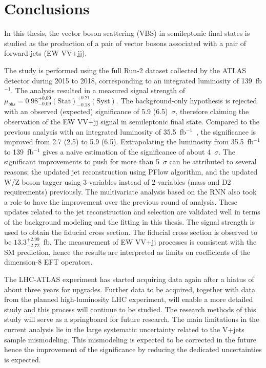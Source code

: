 \chapter{Conclusions}
\label{chap:conclusions}

In this thesis, the vector boson scattering (VBS) in semileptonic final states is studied as the production of a pair of vector bosons associated with a pair of forward jets (EW VV+jj). 

The study is performed using the full Run-2 dataset collected by the ATLAS detector during 2015 to 2018, corresponding to an integrated luminosity of 139~fb$^{-1}$.
The analysis resulted in a measured signal strength of $\mu_{obs} = 0.98^{+ 0.09}_{- 0.09}(\mathrm{Stat})^{+ 0.21}_{- 0.18}(\mathrm{Syst})$.
The background-only hypothesis is rejected with an observed (expected) significance of 5.9 (6.5)~$\sigma$, therefore claiming the observation of the EW VV+jj signal in semileptonic final state. 
Compared to the previous analysis with an integrated luminosity of 35.5~fb$^{-1}$~\cite{STDM-2017-20}, the significance is improved from 2.7 (2.5) to 5.9 (6.5).
Extrapolating the luminosity from 35.5~fb$^{-1}$ to 139~fb$^{-1}$ gives a naive estimation of the significance of about 4~$\sigma$.
The significant improvements to push for more than 5~$\sigma$ can be attributed to several reasons; the updated jet reconstruction using PFlow algorithm, and the updated W/Z boson tagger using 3-variables instead of 2-variables (mass and D2 requirements) previously. 
The multivariate analysis based on the RNN also took a role to have the improvement over the previous round of analysis.
These updates related to the jet reconstruction and selection are validated well in terms of the background modeling and the fitting in this thesis.
The signal strength is used to obtain the fiducial cross section. The fiducial cross section is observed to be $13.3^{+2.99}_{-2.72}$~fb.
The measurement of EW VV+jj processes is consistent with the SM prediction, hence the results are interpreted as limits on coefficients of the dimension-8 EFT operators.

The LHC-ATLAS experiment has started acquiring data again after a hiatus of about three years for upgrades. Further data to be acquired, together with data from the planned high-luminosity LHC experiment, will enable a more detailed study and this process will continue to be studied. 
The research methods of this study will serve as a springboard for future research.
The main limitations in the current analysis lie in the large systematic uncertainty related to the V+jets sample mismodeling. This mismodeling is expected to be corrected in the future hence the improvement of the significance by reducing the dedicated uncertainties is expected.

